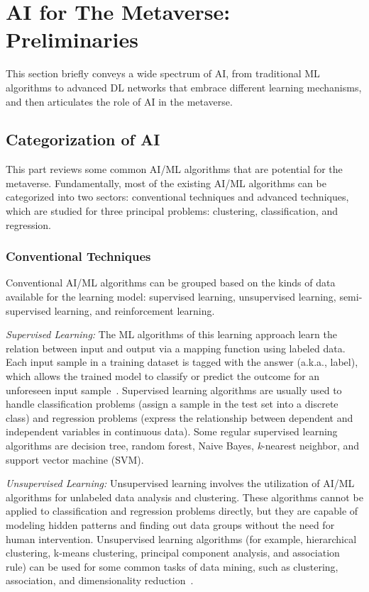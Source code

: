 \documentclass[journal]{IEEEtran}
\begin{document}
\section{AI for The Metaverse: Preliminaries}
\label{sec_preliminaries}
This section briefly conveys a wide spectrum of AI, from traditional ML algorithms to advanced DL networks that embrace different learning mechanisms, and then articulates the role of AI in the metaverse.

\subsection{Categorization of AI}
This part reviews some common AI/ML algorithms that are potential for the metaverse.
Fundamentally, most of the existing AI/ML algorithms can be categorized into two sectors: conventional techniques and advanced techniques, which are studied for three principal problems: clustering, classification, and regression.

\subsubsection{Conventional Techniques}
Conventional AI/ML algorithms can be grouped based on the kinds of data available for the learning model: supervised learning, unsupervised learning, semi-supervised learning, and reinforcement learning.

\textit{Supervised Learning:}
The ML algorithms of this learning approach learn the relation between input and output via a mapping function using labeled data.
Each input sample in a training dataset is tagged with the answer (a.k.a., label), which allows the trained model to classify or predict the outcome for an unforeseen input sample~\cite{kotsiantis2007supervised}.
Supervised learning algorithms are usually used to handle classification problems (assign a sample in the test set into a discrete class) and regression problems (express the relationship between dependent and independent variables in continuous data).
Some regular supervised learning algorithms are decision tree, random forest, Naive Bayes, \textit{k}-nearest neighbor, and support vector machine (SVM).

\textit{Unsupervised Learning:}
Unsupervised learning involves the utilization of AI/ML algorithms for unlabeled data analysis and clustering.
These algorithms cannot be applied to classification and regression problems directly, but they are capable of modeling hidden patterns and finding out data groups without the need for human intervention.
Unsupervised learning algorithms (for example, hierarchical clustering, k-means clustering, principal component analysis, and association rule) can be used for some common tasks of data mining, such as clustering, association, and dimensionality reduction~\cite{hu2015unsupervised}.
\end{document}
